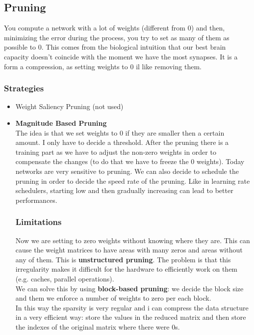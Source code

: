 \subsection{Pruning}

You compute a network with a lot of weights (different from 0) and then, minimizing the error during the process, you try to set as many of them as possible to 0. This comes from the biological intuition that our best brain capacity doesn't coincide with the moment we have the most synapses. It is a form a compression, as setting weights to 0 il like removing them.

\subsubsection{Strategies}
\begin{itemize}
    \item Weight Saliency Pruning (not used)
    \item \textbf{Magnitude Based Pruning}\\
    The idea is that we set weights to 0 if they are smaller then a certain amount. I only have to decide a threshold. After the pruning there is a training part as we have to adjust the non-zero weights in order to compensate the changes (to do that we have to freeze the 0 weights). Today networks are very sensitive to pruning.
    We can also decide to schedule the pruning in order to decide the speed rate of the pruning. Like in learning rate schedulers, starting low and then gradually increasing can lead to better performances.

\subsubsection{Limitations}
Now we are setting to zero weights without knowing where they are. This can cause the weight matrices to have areas with many zeros and areas without any of them. This is \textbf{unstructured pruning}. The problem is that this irregularity makes it difficult for the hardware to efficiently work on them (e.g. caches, parallel operations).\\

We can solve this by using \textbf{block-based pruning}: we decide the block size and them we enforce a number of weights to zero per each block.\\
In this way the sparsity is very regular and i can compress the data structure in a very efficient way: store the values in the reduced matrix and then store the indexes of the original matrix where there were 0s.
\end{itemize}
